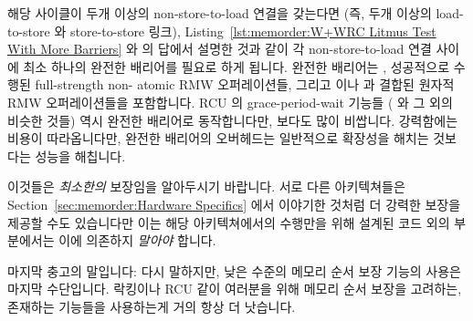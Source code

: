 해당 사이클이 두개 이상의 non-store-to-load 연결을 갖는다면 (즉, 두개 이상의
load-to-store 와 store-to-store 링크),
Listing~\ref{lst:memorder:W+WRC Litmus Test With More Barriers} 와
\QuickQuizARef{\MemorderQQLitmusTestR} 의 답에서 설명한 것과 같이 각
non-store-to-load 연결 사이에 최소 하나의 완전한 배리어를 필요로 하게 됩니다.
완전한 배리어는 , 성공적으로 수행된 full-strength non-
atomic RMW 오퍼레이션들, 그리고  이나
 과 결합된 원자적 RMW 오퍼레이션들을 포함합니다.
RCU 의 grace-period-wait 기능들 ( 와 그 외의 비슷한 것들)
역시 완전한 배리어로 동작합니다만,  보다도 많이 비쌉니다.
강력함에는 비용이 따라옵니다만, 완전한 배리어의 오버헤드는 일반적으로 확장성을
해치는 것보다는 성능을 해칩니다.

이것들은 \emph{최소한의} 보장임을 알아두시기 바랍니다.
서로 다른 아키텍쳐들은
Section~\ref{sec:memorder:Hardware Specifics}
에서 이야기한 것처럼 더 강력한 보장을 제공할 수도 있습니다만 이는 해당
아키텍쳐에서의 수행만을 위해 설계된 코드 외의 부분에서는 이에 의존하지
\emph{말아야} 합니다.

마지막 충고의 말입니다: 다시 말하지만, 낮은 수준의 메모리 순서 보장 기능의
사용은 마지막 수단입니다.
락킹이나 RCU 같이 여러분을 위해 메모리 순서 보장을 고려하는, 존재하는 기능들을
사용하는게 거의 항상 더 낫습니다.

